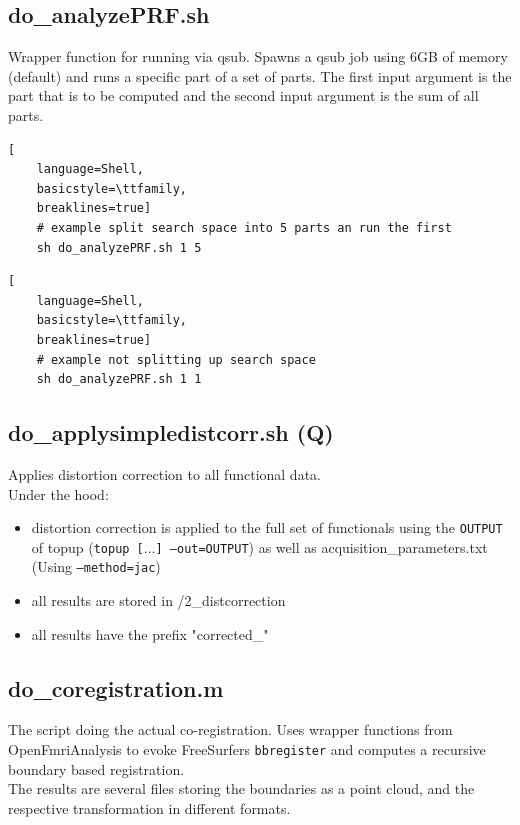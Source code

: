 \documentclass[12pt,a4paper]{scrartcl}
\begin{document}
\subsection{do\_analyzePRF.sh}
\label{sh:analyzePRF}
Wrapper function for running \texttt{} via qsub. Spawns a qsub job using 6GB of memory (default) and runs a specific part of a set of parts. The first input argument is the part that is to be computed and the second input argument is the sum of all parts.
\begin{lstlisting}[
    language=Shell,
    basicstyle=\ttfamily,
    breaklines=true]
    # example split search space into 5 parts an run the first
    sh do_analyzePRF.sh 1 5
\end{lstlisting}
\begin{lstlisting}[
    language=Shell,
    basicstyle=\ttfamily,
    breaklines=true]
    # example not splitting up search space
    sh do_analyzePRF.sh 1 1
\end{lstlisting}

\subsection{do\_applysimpledistcorr.sh (Q)}
\label{sh:applydistcorr}
Applies distortion correction to all functional data.\\

\noindent Under the hood:
\begin{itemize}
\item distortion correction is applied to the full set of functionals using the \texttt{OUTPUT} of topup (\texttt{topup [$\ldots$] --out=OUTPUT}) as well as acquisition\_parameters.txt (Using \texttt{--method=jac})
\item all results are stored in /2\_distcorrection
\item all results have the prefix "corrected\_"
\end{itemize}

\subsection{do\_coregistration.m}
\label{m:coreg}
The script doing the actual co-registration. Uses wrapper functions from OpenFmriAnalysis to evoke FreeSurfers \texttt{bbregister} and computes a recursive boundary based registration.\\

\noindent The results are several files storing the boundaries as a point cloud, and the respective transformation in different formats.
\end{document}
